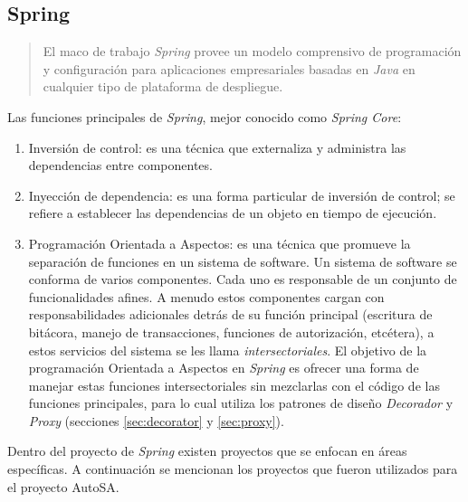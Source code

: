 \subsection{Spring}\label{sec:spring}
\begin{quote}
	El maco de trabajo \textit{Spring} provee un modelo comprensivo de programación y configuración para aplicaciones empresariales basadas en \textit{Java} en cualquier tipo de plataforma de despliegue\cite{SpringFramework}.
\end{quote}

Las funciones principales de \textit{Spring}, mejor conocido como \textit{Spring Core}\cite{Spring5DesignPatterns, ProSpring5, WellGroundedJavaDeveloper, SpringInAction}:
\begin{enumerate}
	\item Inversión de control: es una técnica que externaliza y administra las dependencias entre componentes.

	\item Inyección de dependencia: es una forma particular de inversión de control; se refiere a establecer las dependencias de un objeto en tiempo de ejecución.

	\item Programación Orientada a Aspectos: es una técnica que promueve la separación de funciones en un sistema de software. Un sistema de software se conforma de varios componentes. Cada uno es responsable de un conjunto de funcionalidades afines. A menudo estos componentes cargan con responsabilidades adicionales detrás de su función principal (escritura de bitácora, manejo de transacciones, funciones de autorización, etcétera), a estos servicios del sistema se les llama \textit{intersectoriales}. El objetivo de la programación Orientada a Aspectos en \textit{Spring} es ofrecer una forma de manejar estas funciones intersectoriales sin mezclarlas con el código de las funciones principales, para lo cual utiliza los patrones de diseño \textit{Decorador} y \textit{Proxy} (secciones \ref{sec:decorator} y \ref{sec:proxy}).
\end{enumerate}

Dentro del proyecto de \textit{Spring} existen proyectos que se enfocan en áreas específicas. A continuación se mencionan los proyectos que fueron utilizados para el proyecto AutoSA.

